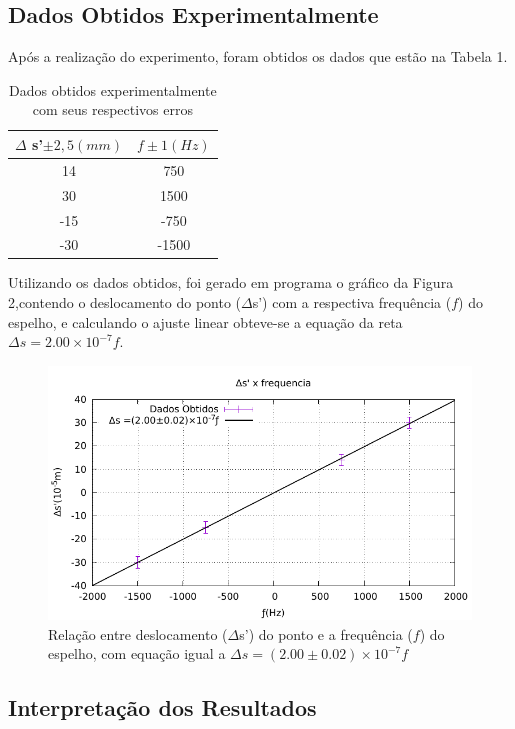 \subsection{Dados Obtidos Experimentalmente}
Após a realização do experimento, foram obtidos os dados que estão na
Tabela 1.
\begin{table}[h!]
\caption{Dados obtidos experimentalmente com seus respectivos erros}
\centering

\begin{tabular}{|	c	|	c	|}
\hline
$\Delta$ s'$\pm 2,5(mm)$ & $f \pm 1(Hz)$   \\ \hline
14          & 750   \\ \hline
30          & 1500  \\ \hline
-15         & -750  \\ \hline
-30         & -1500 \\ \hline
\end{tabular}
\end{table}

Utilizando os dados obtidos, foi gerado em programa o gráfico da
Figura 2,contendo o deslocamento do ponto ($\Delta$s') com a respectiva frequência ($f$) do espelho, e calculando o
ajuste linear obteve-se a equação da reta $\Delta s
=2.00\times10^{-7}f$.


\begin{figure}[!ht]
	\centering
		\includegraphics[scale= 1.1]{Graficusao/c.pdf}
	\caption{Relação entre deslocamento ($\Delta$s') do ponto e a
frequência ($f$) do espelho, com equação igual a $\Delta s
=(2.00\pm0.02)\times10^{-7}f$}
\end{figure}

\subsection{Interpretação dos Resultados}

